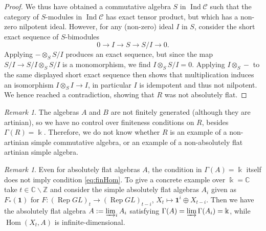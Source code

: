 \documentclass[11pt]{amsart}
\def\Ind{\operatorname{Ind}}
\def\Hom{\operatorname{Hom}}
\def\cC{\mathscr{C}}
\def\bk{\Bbbk}
\def\Rep{\operatorname{Rep}}
\theoremstyle{definition}
\theoremstyle{remark}
\newtheorem{remark}[thm]{Remark}
\numberwithin{equation}{section}
\newcommand{\unit}{\mathbf{1}}
\begin{document}
\begin{proof}
    We thus have obtained a commutative algebra $S$ in $\Ind\cC$ such that the category of $S$-modules in $\Ind\cC$ has exact tensor product, but which has a non-zero nilpotent ideal. However, for any (non-zero) ideal $I$ in $S$, consider the short exact sequence of $S$-bimodules
    $$0\to I\to S\to S/I\to 0.$$
    Applying $-\otimes_SS/I$ produces an exact sequence, but since the map $S/I\to S/I\otimes_S S/I$ is a monomorphism, we find $I\otimes_SS/I=0$. Applying $I\otimes_S-$ to the same displayed short exact sequence then shows that multiplication induces an isomorphism $I\otimes_SI\to I$, in particular $I$ is idempotent and thus not nilpotent. We hence reached a contradiction, showing that $R$ was not absolutely flat.
\end{proof}

\begin{remark}
    The algebras $A$ and $B$ are not finitely generated (although they are artinian), so we have no control over finiteness conditions on $R$, besides $\Gamma(R)=\bk$. Therefore, we do not know whether $R$ is an example of a non-artinian simple commutative algebra, or an example of a non-absolutely flat artinian simple algebra. 
\end{remark}


\begin{remark}
Even for absolutely flat algebras $A$, the condition in $\Gamma(A)=\bk$ itself does not imply condition \eqref{eq:finHom}. To give a concrete example over $\Bbbk=\mathbb{C}$ take $t\in\mathbb{C}\backslash\mathbb{Z}$ and consider the simple absolutely flat algebras $A_i$ given as $F_\ast(\unit)$ for $F:(\Rep GL)_t\to (\Rep GL)_{t-i}$, $X_t\mapsto \unit^i\oplus X_{t-i}$. Then we have the absolutely flat algebra $A:=\varinjlim_{i}A_i$ satisfying $\Gamma(A)=\varinjlim \Gamma(A_i)=\bk$, while $\Hom(X_t,A)$ is infinite-dimensional.
\end{remark}






\end{document}
